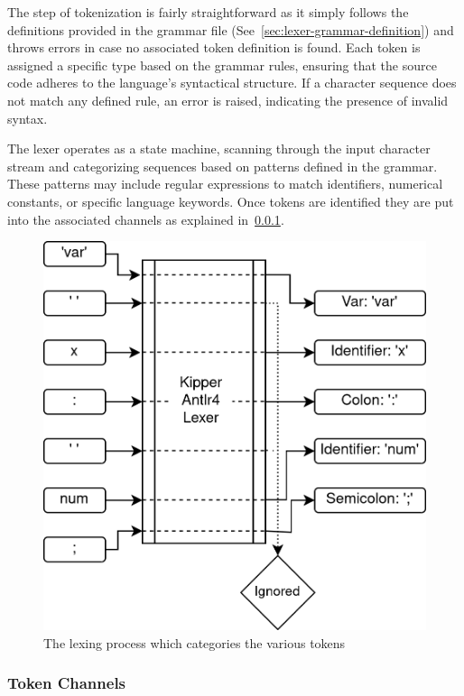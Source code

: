 The step of tokenization is fairly straightforward as it simply follows the definitions provided in the grammar file (See~\ref{sec:lexer-grammar-definition}) and throws errors in case no associated token definition is found. Each token is assigned a specific type based on the grammar rules, ensuring that the source code adheres to the language's syntactical structure. If a character sequence does not match any defined rule, an error is raised, indicating the presence of invalid syntax.

The lexer operates as a state machine, scanning through the input character stream and categorizing sequences based on patterns defined in the grammar. These patterns may include regular expressions to match identifiers, numerical constants, or specific language keywords. Once tokens are identified they are put into the associated channels as explained in~\ref{sec:token-channels}.

\begin{figure}[h!]
	\centering
	\includegraphics[scale=1]{./pics/Lexer-Algorithm.drawio}
	\caption{The lexing process which categories the various tokens}
	\label{fig:implementation:Lexer-Algorithm}
\end{figure}

\subsubsection{Token Channels}
\label{sec:token-channels}

